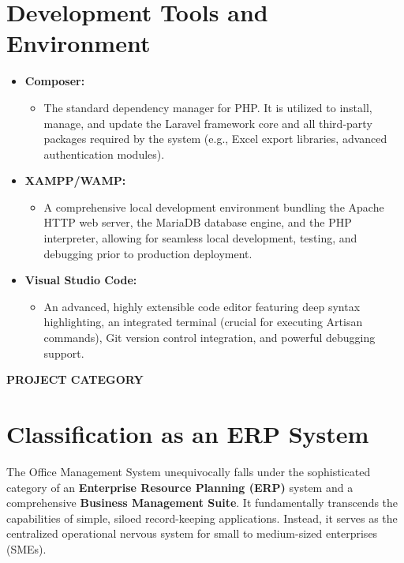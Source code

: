 ﻿\documentclass[12pt,a4paper]{report}
\begin{document}
\section*{Development Tools and Environment}
\begin{itemize}
    \item \textbf{Composer:}
    \begin{itemize}
        \item The standard dependency manager for PHP. It is utilized to install, manage, and update the Laravel framework core and all third-party packages required by the system (e.g., Excel export libraries, advanced authentication modules).
    \end{itemize}
    \item \textbf{XAMPP/WAMP:}
    \begin{itemize}
        \item A comprehensive local development environment bundling the Apache HTTP web server, the MariaDB database engine, and the PHP interpreter, allowing for seamless local development, testing, and debugging prior to production deployment.
    \end{itemize}
    \item \textbf{Visual Studio Code:}
    \begin{itemize}
        \item An advanced, highly extensible code editor featuring deep syntax highlighting, an integrated terminal (crucial for executing Artisan commands), Git version control integration, and powerful debugging support.
    \end{itemize}
\end{itemize}

\newpage
\vspace*{\fill}
\begin{center}
{\LARGE \textbf{PROJECT CATEGORY}}
\end{center}
\vspace*{\fill}

\newpage
\section*{Classification as an ERP System}
The Office Management System unequivocally falls under the sophisticated category of an \textbf{Enterprise Resource Planning (ERP)} system and a comprehensive \textbf{Business Management Suite}. It fundamentally transcends the capabilities of simple, siloed record-keeping applications. Instead, it serves as the centralized operational nervous system for small to medium-sized enterprises (SMEs). 
\end{document}
